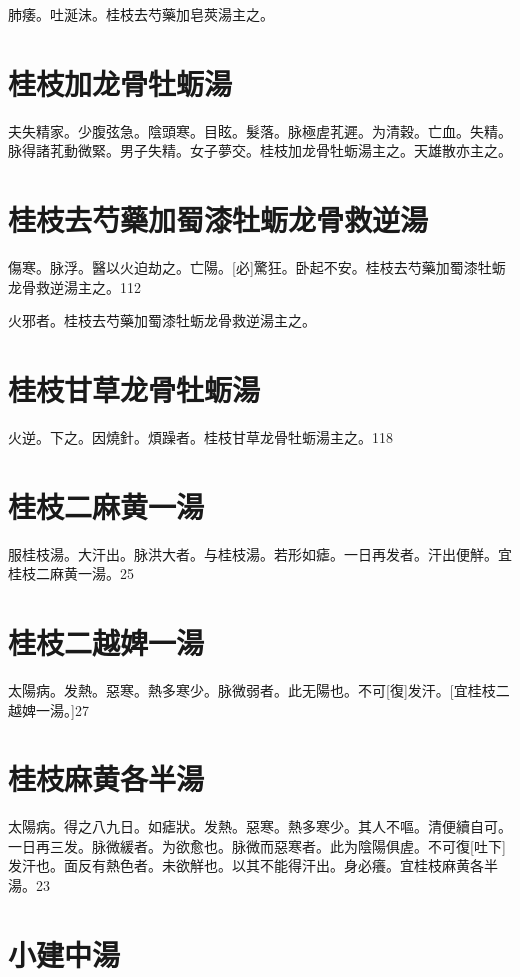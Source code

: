\documentclass[12pt,twoside,UTF8,b5paper]{ctexbook}
\begin{document}
肺痿。吐涎沫。桂枝去芍藥加皂莢湯主之。

\section{桂枝加龙骨牡蛎湯}

夫失精家。少腹弦急。陰頭寒。目眩。髮落。脉極虗芤遲。为清穀。亡血。失精。脉得諸芤動微緊。男子失精。女子夢交。桂枝加龙骨牡蛎湯主之。天雄散亦主之。

\section{桂枝去芍藥加蜀漆牡蛎龙骨救逆湯}

傷寒。脉浮。醫以火迫劫之。亡陽。[必]驚狂。卧起不安。桂枝去芍藥加蜀漆牡蛎龙骨救逆湯主之。112

火邪者。桂枝去芍藥加蜀漆牡蛎龙骨救逆湯主之。

\section{桂枝甘草龙骨牡蛎湯}

火逆。下之。因燒針。煩躁者。桂枝甘草龙骨牡蛎湯主之。118

\section{桂枝二麻黄一湯}

服桂枝湯。大汗出。脉洪大者。与桂枝湯。若形如瘧。一日再发者。汗出便觧。宜桂枝二麻黄一湯。25

\section{桂枝二越婢一湯}

太陽病。发熱。惡寒。熱多寒少。脉微弱者。此无陽也。不可[復]发汗。[宜桂枝二越婢一湯。]27

\section{桂枝麻黄各半湯}

太陽病。得之八九日。如瘧狀。发熱。惡寒。熱多寒少。其人不嘔。清便續自可。一日再三发。脉微緩者。为欲愈也。脉微而惡寒者。此为陰陽俱虗。不可復[吐下]发汗也。面反有熱色者。未欲觧也。以其不能得汗出。身必癢。宜桂枝麻黄各半湯。23

\section{小建中湯}
\end{document}
